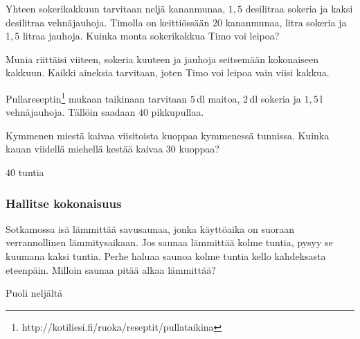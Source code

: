 \begin{tehtavasivu}
\begin{tehtava}
Yhteen sokerikakkuun tarvitaan neljä kananmunaa, $1,5$ desilitraa sokeria ja kaksi desilitraa vehnäjauhoja. Timolla on keittiössään $20$ kananmunaa, litra sokeria ja $1,5$ litraa jauhoja. Kuinka monta sokerikakkua Timo voi leipoa?  
	\begin{vastaus}
Munia riittäisi viiteen, sokeria kuuteen ja jauhoja seitsemään kokonaiseen kakkuun. Kaikki aineksia tarvitaan, joten Timo voi leipoa vain viisi kakkua.
	\end{vastaus}
\end{tehtava}

\begin{tehtava}
Pullareseptin\footnote{http://kotiliesi.fi/ruoka/reseptit/pullataikina} mukaan taikinaan tarvitaan $5$\,dl maitoa, $2$\,dl sokeria ja $1,5$\,l vehnäjauhoja. Tällöin saadaan $40$ pikkupullaa.
	\begin{vastaus}
	\end{vastaus}
\end{tehtava}

\begin{tehtava}
	Kymmenen miestä kaivaa viisitoista kuoppaa kymmenessä tunnissa. Kuinka kauan viidellä miehellä kestää kaivaa $30$ kuoppaa?	
	\begin{vastaus}
		$40$ tuntia
	\end{vastaus}
\end{tehtava}

\subsubsection*{Hallitse kokonaisuus}

\begin{tehtava}
Sotkamossa isä lämmittää savusaunaa, jonka käyttöaika on suoraan verrannollinen lämmitysaikaan. Jos saunaa lämmittää kolme tuntia, pysyy se kuumana kaksi tuntia. Perhe haluaa saunoa kolme tuntia kello kahdeksasta eteenpäin. Milloin saunaa pitää alkaa lämmittää?
	\begin{vastaus}
Puoli neljältä
	\end{vastaus}
\end{tehtava}


\end{tehtavasivu}
